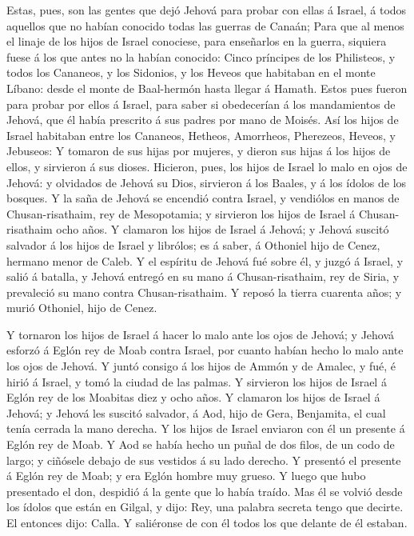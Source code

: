  Estas, pues, son las gentes que dejó Jehová para probar con
ellas á Israel, á todos aquellos que no habían conocido todas las
guerras de Canaán;  Para que al menos el linaje de los hijos
de Israel conociese, para enseñarlos en la guerra, siquiera fuese á los
que antes no la habían conocido:  Cinco príncipes de los
Philisteos, y todos los Cananeos, y los Sidonios, y los Heveos que
habitaban en el monte Líbano: desde el monte de Baal-hermón hasta llegar
á Hamath.  Estos pues fueron para probar por ellos á Israel,
para saber si obedecerían á los mandamientos de Jehová, que él había
prescrito á sus padres por mano de Moisés.  Así los hijos de
Israel habitaban entre los Cananeos, Hetheos, Amorrheos, Pherezeos,
Heveos, y Jebuseos:  Y tomaron de sus hijas por mujeres, y
dieron sus hijas á los hijos de ellos, y sirvieron á sus dioses.
 Hicieron, pues, los hijos de Israel lo malo en ojos de
Jehová: y olvidados de Jehová su Dios, sirvieron á los Baales, y á los
ídolos de los bosques.  Y la saña de Jehová se encendió
contra Israel, y vendiólos en manos de Chusan-risathaim, rey de
Mesopotamia; y sirvieron los hijos de Israel á Chusan-risathaim ocho
años.  Y clamaron los hijos de Israel á Jehová; y Jehová
suscitó salvador á los hijos de Israel y librólos; es á saber, á
Othoniel hijo de Cenez, hermano menor de Caleb.  Y el
espíritu de Jehová fué sobre él, y juzgó á Israel, y salió á batalla, y
Jehová entregó en su mano á Chusan-risathaim, rey de Siria, y prevaleció
su mano contra Chusan-risathaim.  Y reposó la tierra
cuarenta años; y murió Othoniel, hijo de Cenez.

 Y tornaron los hijos de Israel á hacer lo malo ante los
ojos de Jehová; y Jehová esforzó á Eglón rey de Moab contra Israel, por
cuanto habían hecho lo malo ante los ojos de Jehová.  Y
juntó consigo á los hijos de Ammón y de Amalec, y fué, é hirió á Israel,
y tomó la ciudad de las palmas.  Y sirvieron los hijos de
Israel á Eglón rey de los Moabitas diez y ocho años.  Y
clamaron los hijos de Israel á Jehová; y Jehová les suscitó salvador, á
Aod, hijo de Gera, Benjamita, el cual tenía cerrada la mano derecha. Y
los hijos de Israel enviaron con él un presente á Eglón rey de Moab.
 Y Aod se había hecho un puñal de dos filos, de un codo de
largo; y ciñósele debajo de sus vestidos á su lado derecho.
 Y presentó el presente á Eglón rey de Moab; y era Eglón
hombre muy grueso.  Y luego que hubo presentado el don,
despidió á la gente que lo había traído.  Mas él se volvió
desde los ídolos que están en Gilgal, y dijo: Rey, una palabra secreta
tengo que decirte. El entonces dijo: Calla. Y saliéronse de con él todos
los que delante de él estaban.

